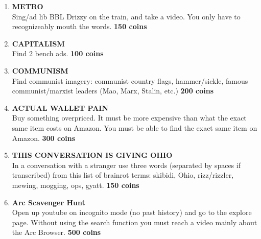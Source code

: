 \documentclass{article}
\begin{document}
\begin{enumerate}
    \item \textbf{METRO} \\ Sing/ad lib BBL Drizzy on the train, and take a video. You only have to recognizeably mouth the words. \textbf{150 coins}
    \item \textbf{CAPITALISM} \\ Find 2 bench ads. \textbf{100 coins}
    \item \textbf{COMMUNISM} \\ Find communist imagery: communist country flags, hammer/sickle, famous communist/marxist leaders (Mao, Marx, Stalin, etc.) \textbf{200 coins}
    \item \textbf{ACTUAL WALLET PAIN} \\ Buy something overpriced. It must be more expensive than what the exact same item costs on Amazon. You must be able to find the exact same item on Amazon. \textbf{300 coins}
    \item \textbf{THIS CONVERSATION IS GIVING OHIO} \\ In a conversation with a stranger use three words (separated by spaces if transcribed) from this list of brainrot terms: skibidi, Ohio, rizz/rizzler, mewing, mogging, ops, gyatt. \textbf{150 coins}
    \item \textbf{Arc Scavenger Hunt} \\ Open up youtube on incognito mode (no past history) and go to the explore page. Without using the search function you must reach a video mainly about the Arc Browser. \textbf{500 coins}
    
\end{enumerate}
\end{document}
